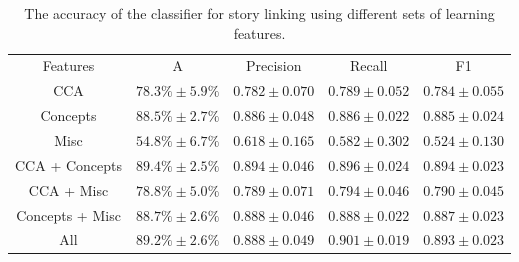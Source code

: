 \documentclass[twoside,11pt]{article}
\begin{document}

\begin{table}[h]
\caption{The accuracy of the classifier for story linking using different sets of learning features.}
\label{table:linkingEval}
\begin{center}
\begin{tabular}{|c|c|c|c|c|}
  \hline
  \cline{1-5}
  Features & A & Precision & Recall & F1 \\ \cline{1-5}
  CCA & $78.3\% \pm 5.9\%$ & $0.782 \pm 0.070$ & $0.789 \pm 0.052$ & $0.784 \pm 0.055$ \\ \cline{1-5}
  Concepts & $88.5\% \pm 2.7\%$ & $0.886 \pm 0.048$ & $0.886 \pm 0.022$ & $0.885 \pm 0.024$ \\ \cline{1-5}
  Misc & $54.8\% \pm 6.7\%$ & $0.618 \pm 0.165$ & $0.582 \pm 0.302$ & $0.524 \pm 0.130$ \\ \cline{1-5}
  CCA + Concepts & $89.4\% \pm 2.5\%$ & $0.894 \pm 0.046$ & $0.896 \pm 0.024$ & $0.894 \pm 0.023$ \\ \cline{1-5}
  CCA + Misc & $78.8\% \pm 5.0\%$ & $0.789 \pm 0.071$ & $0.794 \pm 0.046$ & $0.790 \pm 0.045$ \\ \cline{1-5}
  Concepts + Misc & $88.7\% \pm 2.6\%$ & $0.888 \pm 0.046$ & $0.888 \pm 0.022$ & $0.887 \pm 0.023$ \\ \cline{1-5}
  All & $89.2\% \pm 2.6\%$ & $0.888 \pm 0.049$ & $0.901 \pm 0.019$ & $0.893 \pm 0.023$ \\ \cline{1-5}
  \hline
\end{tabular}
\end{center}
\end{table}
\end{document}
